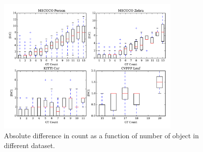 \begin{figure}[h]
\centering
\includegraphics[width=0.8\textwidth]{count.pdf}
\caption{Absolute difference in count as a function of number of object in
different dataset.}
\label{fig:count}
\end{figure}
